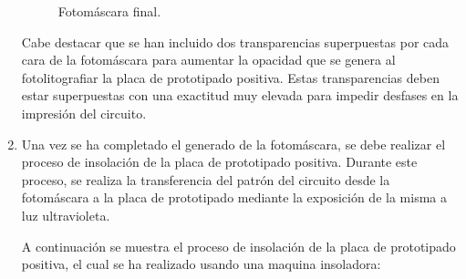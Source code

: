 \begin{enumerate}
    \begin{figure}[H]
    \centering
    \caption{Fotomáscara final.}
    \end{figure}
    
    Cabe destacar que se han incluido dos transparencias superpuestas por cada cara de la fotomáscara para aumentar la opacidad que se genera al fotolitografiar la placa de prototipado positiva. Estas transparencias deben estar superpuestas con una exactitud muy elevada para impedir desfases en la impresión del circuito.
    
    \item Una vez se ha completado el generado de la fotomáscara, se debe realizar el proceso de insolación de la placa de prototipado positiva. Durante este proceso, se realiza la transferencia del patrón del circuito desde la fotomáscara a la placa de prototipado mediante la exposición de la misma a luz ultravioleta.
    
    A continuación se muestra el proceso de insolación de la placa de prototipado positiva, el cual se ha realizado usando una maquina insoladora:
    


\end{enumerate}
